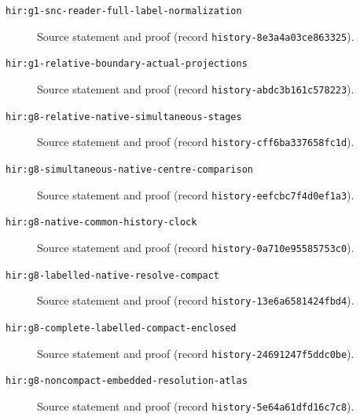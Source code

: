 \begin{description}
\item[\texttt{hir:g1-snc-reader-full-label-normalization}]\label{hir:g1-snc-reader-full-label-normalization}
Source statement and proof (record \texttt{history-8e3a4a03ce863325}).
\item[\texttt{hir:g1-relative-boundary-actual-projections}]\label{hir:g1-relative-boundary-actual-projections}
Source statement and proof (record \texttt{history-abdc3b161c578223}).
\item[\texttt{hir:g8-relative-native-simultaneous-stages}]\label{hir:g8-relative-native-simultaneous-stages}
Source statement and proof (record \texttt{history-cff6ba337658fc1d}).
\item[\texttt{hir:g8-simultaneous-native-centre-comparison}]\label{hir:g8-simultaneous-native-centre-comparison}
Source statement and proof (record \texttt{history-eefcbc7f4d0ef1a3}).
\item[\texttt{hir:g8-native-common-history-clock}]\label{hir:g8-native-common-history-clock}
Source statement and proof (record \texttt{history-0a710e95585753c0}).
\item[\texttt{hir:g8-labelled-native-resolve-compact}]\label{hir:g8-labelled-native-resolve-compact}
Source statement and proof (record \texttt{history-13e6a6581424fbd4}).
\item[\texttt{hir:g8-complete-labelled-compact-enclosed}]\label{hir:g8-complete-labelled-compact-enclosed}
Source statement and proof (record \texttt{history-24691247f5ddc0be}).
\item[\texttt{hir:g8-noncompact-embedded-resolution-atlas}]\label{hir:g8-noncompact-embedded-resolution-atlas}
Source statement and proof (record \texttt{history-5e64a61dfd16c7c8}).
\end{description}
